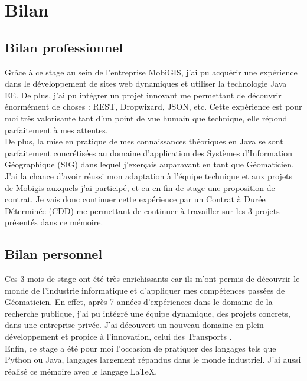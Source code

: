 \chapter{Bilan}
\label{Bilan}


\section{Bilan professionnel}

Grâce à ce stage au sein de l'entreprise MobiGIS, j'ai pu acquérir une expérience dans le développement de sites web dynamiques et utiliser la technologie Java EE. De plus, j'ai pu intégrer un projet innovant me permettant de découvrir énormément de choses : REST, Dropwizard, JSON, etc. Cette expérience est pour moi très valorisante tant d'un point de vue humain que technique, elle répond parfaitement à mes attentes.\\

De plus, la mise en pratique de mes connaissances théoriques en Java se sont parfaitement concrétisées au domaine d'application des Systèmes d'Information Géographique (SIG) dans lequel j'exerçais auparavant en tant que Géomaticien. \\

J'ai la chance d'avoir réussi mon adaptation à l'équipe technique et aux projets de Mobigis auxquels j'ai participé, et eu en fin de stage une proposition de contrat. Je vais donc continuer cette expérience par un Contrat à Durée Déterminée (CDD) me permettant de continuer à travailler sur les 3 projets présentés dans ce mémoire. \\

\section{Bilan personnel}

Ces 3 mois de stage ont été très enrichissants car ils m'ont permis de découvrir le monde de l'industrie informatique et d'appliquer mes compétences passées de Géomaticien. En effet, après 7 années d'expériences dans le domaine de la recherche publique, j'ai pu intégré une équipe dynamique, des projets concrets, dans une entreprise privée. J'ai découvert un nouveau domaine en plein développement et propice à l'innovation, celui des \og Transports \fg. \\

Enfin, ce stage a été pour moi l'occasion de pratiquer des langages tels que Python ou Java, langages largement répandus dans le monde industriel. J'ai aussi réalisé ce mémoire avec le langage  \LaTeX{}.\\